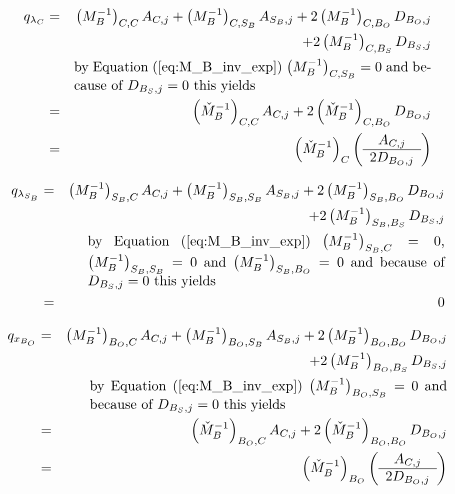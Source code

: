 \documentclass[a4paper]{article}
\begin{document}
\begin{eqnarray}
\label{eq:q_C}
q_{\lambda_{C}}
&=&
\left(M_{B}^{-1}\right)_{C,C}A_{C,j}
+\left(M_{B}^{-1}\right)_{C, S_{B}}A_{S_{B}, j}
+2\left(M_{B}^{-1}\right)_{C, B_{O}}D_{B_{O}, j}
\nonumber \\
&&
+2\left(M_{B}^{-1}\right)_{C, B_{S}}D_{B_{S}, j}
\nonumber \\
&&\begin{minipage}{9cm}
by Equation~(\ref{eq:M_B_inv_exp}) $\left(M_{B}^{-1}\right)_{C, S_{B}}=0$
and because of $D_{B_{S},j}=0$ this yields
\end{minipage}
\nonumber \\
&=&
\left(\check{M}_{B}^{-1}\right)_{C,C}A_{C,j}
+2\left(\check{M}_{B}^{-1}\right)_{C, B_{O}}D_{B_{O}, j}
\nonumber \\
&=&
\left(\check{M}_{B}^{-1}\right)_{C}
\left(\begin{array}{c}
        A_{C, j} \\
	\hline
	2D_{B_{O}, j}
      \end{array}
\right)       
\end{eqnarray}

\begin{eqnarray}
q_{\lambda_{S_{B}}}
&=&
\left(M_{B}^{-1}\right)_{S_{B},C}A_{C,j}
+\left(M_{B}^{-1}\right)_{S_{B}, S_{B}}A_{S_{B}, j}
+2\left(M_{B}^{-1}\right)_{S_{B}, B_{O}}D_{B_{O}, j}
\nonumber \\
&&
+2\left(M_{B}^{-1}\right)_{S_{B}, B_{S}}D_{B_{S}, j}
\nonumber \\
&&\begin{minipage}{9cm}
by Equation~(\ref{eq:M_B_inv_exp}) $\left(M_{B}^{-1}\right)_{S_{B}, C}=0$,
$\left(M_{B}^{-1}\right)_{S_{B}, S_{B}}=0$ and 
$\left(M_{B}^{-1}\right)_{S_{B}, B_{O}}=0$
and because of $D_{B_{S},j}=0$ 
this yields
\end{minipage}
\nonumber \\
&=&
0
\end{eqnarray}

\begin{eqnarray}
\label{eq:q_B_O}
q_{x_{B_{O}}}
&=&
\left(M_{B}^{-1}\right)_{B_{O},C}A_{C,j}
+\left(M_{B}^{-1}\right)_{B_{O}, S_{B}}A_{S_{B}, j}
+2\left(M_{B}^{-1}\right)_{B_{O}, B_{O}}D_{B_{O}, j}
\nonumber \\
&&
+2\left(M_{B}^{-1}\right)_{B_{O}, B_{S}}D_{B_{S}, j}
\nonumber \\
&&\begin{minipage}{9cm}
by Equation~(\ref{eq:M_B_inv_exp}) $\left(M_{B}^{-1}\right)_{B_{O}, S_{B}}=0$
and because of $D_{B_{S},j}=0$ this yields
\end{minipage}
\nonumber \\
&=&
\left(\check{M}_{B}^{-1}\right)_{B_{O}, C}A_{C,j}
+2\left(\check{M}_{B}^{-1}\right)_{B_{O}, B_{O}}D_{B_{O}, j}
\nonumber \\
&=&
\left(\check{M}_{B}^{-1}\right)_{B_{O}}
\left(\begin{array}{c}
        A_{C, j} \\
	\hline
	2D_{B_{O}, j}
      \end{array}
\right)       
\end{eqnarray}
\end{document}
